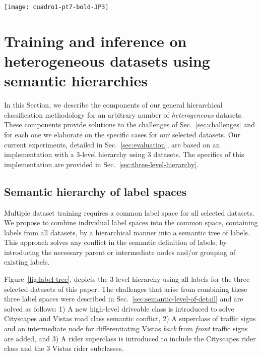 \documentclass[letterpaper, 10 pt, conference]{ieeeconf}
\begin{document}
\begin{figure*}
	\centering
	\texttt{[image: cuadro1-pt7-bold-JP3]}
	\caption{Three-level semantic label hierarchy combining 108 classes from Cityscapes, Mapillary Vistas and GTSDB dataset. Classes marked in black correspond to the L1, L2, and L3 classifiers of Fig.~\ref{fig:algorithm-overview}.}
	\label{fig:label-tree}
\end{figure*}

\section{Training and inference on heterogeneous datasets using semantic hierarchies}
\label{sec:proposed-method}
In this Section, we describe the components of our general hierarchical classification methodology for an arbitrary number of \textit{heterogeneous} datasets. These components provide solutions to the challenges of Sec.~\ref{sec:challenges} and for each one we elaborate on the specific cases for our selected datasets. Our current experiments, detailed in Sec.~\ref{sec:evaluation}, are based on an implementation with a 3-level hierarchy using 3 datasets. The specifics of this implementation are provided in Sec.~\ref{sec:three-level-hierarchy}.

\subsection{Semantic hierarchy of label spaces}
\label{subsec:semantic-hierarchy-of-label-spaces}
Multiple dataset training requires a common label space for all selected datasets. We propose to combine individual label spaces into the common space, containing labels from all datasets, by a hierarchical manner into a semantic tree of labels. This approach solves any conflict in the semantic definition of labels, by introducing the necessary parent or intermediate nodes and/or grouping of existing labels.

Figure~\ref{fig:label-tree}, depicts the 3-level hierarchy using all labels for the three selected datasets of this paper. The challenges that arise from combining these three label spaces were described in Sec.~\ref{sec:semantic-level-of-detail} and are solved as follows: 1) A new high-level driveable class is introduced to solve Cityscapes and Vistas road class semantic conflict, 2) A superclass of traffic signs and an intermediate node for differentiating Vistas \textit{back} from \textit{front} traffic signs are added, and 3) A rider superclass is introduced to include the Cityscapes rider class and the 3 Vistas rider subclasses.
\end{document}
